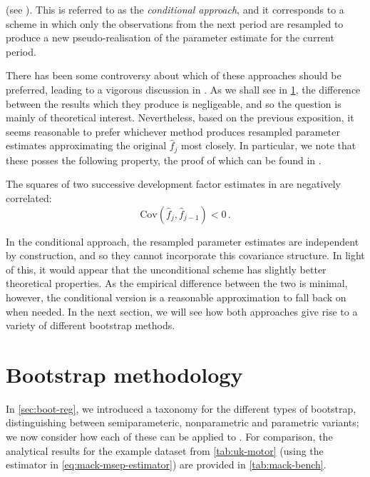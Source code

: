 \documentclass[a4paper]{book}
\begin{document}
(see \cite[46]{wuthrich:stochastic-reserving}). This is referred to as the \emph{conditional approach}, and it corresponds to a scheme in which only the observations from the next period are resampled to produce a new pseudo-realisation of the parameter estimate for the current period.

There has been some controversy about which of these approaches should be preferred, leading to a vigorous discussion in \cite{wuthrich:chain-ladder-msep, mack:msep, gisler:msep, venter:msep}. As we shall see in \cref{sec:mack-boot}, the difference between the results which they produce is negligeable, and so the question is mainly of theoretical interest. Nevertheless, based on the previous exposition, it seems reasonable to prefer whichever method produces resampled parameter estimates approximating the original $\widehat{f}_j$ most closely. In particular, we note that these posses the following property, the proof of which can be found in \cite{mack:msep}.

\begin{theorem}
  The squares of two successive development factor estimates in  are negatively correlated:
  \begin{equation}
    \mathrm{Cov}(\widehat{f}_j, \widehat{f}_{j - 1}) < 0 \,.
  \end{equation}
\end{theorem}

\noindent In the conditional approach, the resampled parameter estimates are independent by construction, and so they cannot incorporate this covariance structure. In light of this, it would appear that the unconditional scheme has slightly better theoretical properties. As the empirical difference between the two is minimal, however, the conditional version is a reasonable approximation to fall back on when needed. In the next section, we will see how both approaches give rise to a variety of different bootstrap methods.

\section{Bootstrap methodology} \label{sec:mack-boot}

In \cref{sec:boot-reg}, we introduced a taxonomy for the different types of bootstrap, distinguishing between semiparameteric, nonparametric and parametric variants; we now consider how each of these can be applied to . For comparison, the analytical results for the example dataset from \cref{tab:uk-motor} (using the estimator in \cref{eq:mack-msep-estimator}) are provided in \cref{tab:mack-bench}.
\end{document}
